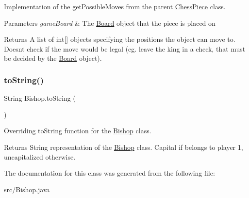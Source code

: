 Implementation of the get\+Possible\+Moves from the parent \mbox{\hyperlink{class_chess_piece}{Chess\+Piece}} class. 
\begin{DoxyParams}{Parameters}
{\em game\+Board} & The \mbox{\hyperlink{class_board}{Board}} object that the piece is placed on \\
\hline
\end{DoxyParams}
\begin{DoxyReturn}{Returns}
A list of int\mbox{[}\mbox{]} objects specifying the positions the object can move to. Doesn\textquotesingle{}t check if the move would be legal (eg. leave the king in a check, that must be decided by the \mbox{\hyperlink{class_board}{Board}} object). 
\end{DoxyReturn}
\mbox{\label{class_bishop_af8fef6f201eda44ed2a36bd1f1775c26}} 
\subsubsection{\texorpdfstring{to\+String()}{toString()}}
{\footnotesize\ttfamily String Bishop.\+to\+String (\begin{DoxyParamCaption}{ }\end{DoxyParamCaption})}

Overriding to\+String function for the \mbox{\hyperlink{class_bishop}{Bishop}} class. \begin{DoxyReturn}{Returns}
String representation of the \mbox{\hyperlink{class_bishop}{Bishop}} class. Capital if belongs to player 1, uncapitalized otherwise. 
\end{DoxyReturn}


The documentation for this class was generated from the following file\+:\begin{DoxyCompactItemize}
\item 
src/Bishop.\+java\end{DoxyCompactItemize}

